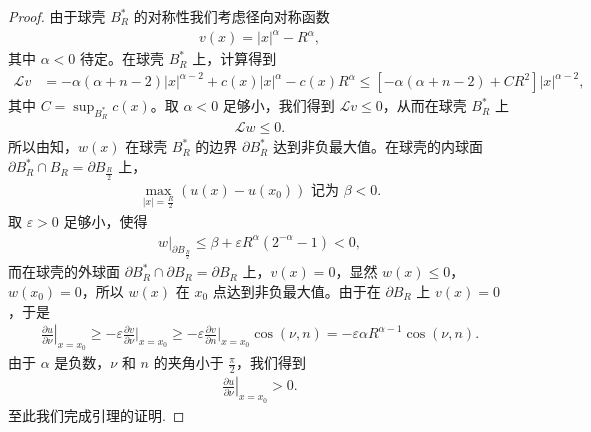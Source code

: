 \documentclass[../../main.tex]{subfiles}%
\begin{document}
\begin{proof}
由于球壳 $B_R^*$ 的对称性我们考虑径向对称函数
\begin{align*}
v(x) = |x|^\alpha - R^\alpha,
\end{align*}
其中 $\alpha<0$ 待定。在球壳 $B_R^*$ 上，计算得到
\begin{align*}
\mathcal{L}v &= -\alpha(\alpha+n-2)|x|^{\alpha-2} + c(x)|x|^\alpha - c(x)R^\alpha \leqslant \left[-\alpha(\alpha+n-2) + CR^2\right]|x|^{\alpha-2},
\end{align*}
其中 $C=\sup_{B_R^*} c(x)$。取 $\alpha<0$ 足够小，我们得到 $\mathcal{L}v\leqslant 0$，从而在球壳 $B_R^*$ 上
\begin{align*}
\mathcal{L}w \leqslant 0.
\end{align*}
所以由知，$w(x)$ 在球壳 $B_R^*$ 的边界 $\partial B_R^*$ 达到非负最大值。在球壳的内球面 $\partial B_R^*\cap B_R = \partial B_{\frac{R}{2}}$ 上，
\begin{align*}
\max_{|x|=\frac{R}{2}} (u(x)-u(x_0)) \text{ 记为 } \beta < 0.
\end{align*}
取 $\varepsilon>0$ 足够小，使得
\begin{align*}
w|_{\partial B_{\frac{R}{2}}} \leqslant \beta + \varepsilon R^\alpha(2^{-\alpha}-1) < 0,
\end{align*}
而在球壳的外球面 $\partial B_R^*\cap\partial B_R = \partial B_R$ 上，$v(x)=0$，显然 $w(x)\leqslant 0$，$w(x_0)=0$，所以 $w(x)$ 在 $x_0$ 点达到非负最大值。由于在 $\partial B_R$ 上 $v(x)=0$，于是
\begin{align*}
\left.\frac{\partial u}{\partial \nu}\right|_{x=x_0} \geqslant -\varepsilon \frac{\partial v}{\partial \nu}\bigg|_{x=x_0} \geqslant -\varepsilon \frac{\partial v}{\partial n}\bigg|_{x=x_0} \cos(\nu,n) = -\varepsilon \alpha R^{\alpha-1}\cos(\nu,n).
\end{align*}
由于 $\alpha$ 是负数，$\nu$ 和 $n$ 的夹角小于 $\frac{\pi}{2}$，我们得到
\begin{align*}
\left.\frac{\partial u}{\partial \nu}\right|_{x=x_0} > 0.
\end{align*}
至此我们完成引理的证明.
\end{proof}
\end{document}
